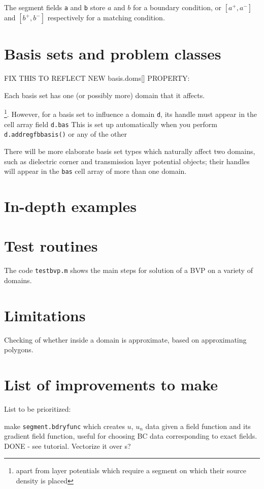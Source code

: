\documentclass[12pt]{article}
\begin{document}
The segment fields {\tt a} and {\tt b} store
$a$ and $b$ for a boundary condition, or
$[a^+, a^-]$ and $[b^+, b^-]$
respectively for a matching condition.

\section{Basis sets and problem classes}

FIX THIS TO REFLECT NEW basis.doms[] PROPERTY:

Each basis set has one (or possibly more) domain that it affects.


\footnote{apart from layer potentials which require a segment on which
their source density is placed}.
However, for a basis set to influence a domain {\tt d}, its handle must appear
in the cell array field {\tt d.bas}
This is set up automatically when you perform {\tt d.addregfbbasis()}
or any of the other 

There will be more elaborate basis set types which naturally affect two domains,
such as dielectric corner and transmission layer potential objects;
their handles will appear in the {\tt bas} cell array of more than one domain.


\section{In-depth examples}

\section{Test routines}

The code {\tt testbvp.m} shows the main steps for solution of a BVP on
a variety of domains.

\section{Limitations}

\bi
\item Checking of whether inside a domain is approximate, based on approximating
polygons.
\ei

\section{List of improvements to make}

List to be prioritized:

\bi
\item make {\tt segment.bdryfunc} which creates $u$, $u_n$ data given a
field function and its gradient field function, useful for choosing BC
data corresponding to exact fields. DONE - see tutorial.
Vectorize it over s?
\end{document}
